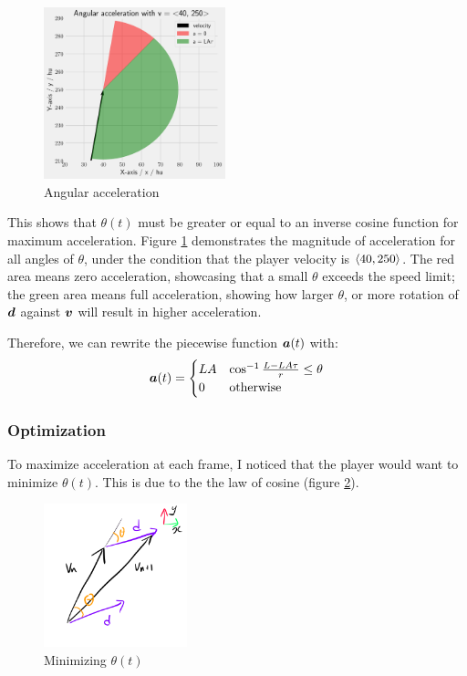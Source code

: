 \begin{figure}
    \includegraphics[width=0.47\textwidth,right]{assets/angular_acceleration_limiting.png}
    \caption{Angular acceleration}
    \label{fig:angular_acceleration_limiting}
\end{figure}
This shows that $\theta(t)$ must be greater or equal to an inverse cosine function for maximum acceleration. Figure \ref{fig:angular_acceleration_limiting} demonstrates the magnitude of acceleration for all angles of $\theta$, under the condition that the player velocity is $\left\langle 40, 250 \right\rangle$. The red area means zero acceleration, showcasing that a small $\theta$ exceeds the speed limit; the green area means full acceleration, showing how larger $\theta$, or more rotation of $\boldsymbol{d}$ against $\boldsymbol{v}$ will result in higher acceleration.

Therefore, we can rewrite the piecewise function $\boldsymbol{a}(t)$ with:
\[
\boldsymbol{a}(t) = \begin{cases}
    LA & \cos^{-1} \frac{L - LA\tau}{r} \le \theta\\
    0 & \text{otherwise}
\end{cases}
\]


\subsubsection{Optimization}
To maximize acceleration at each frame, I noticed that the player would want to minimize $\theta(t)$. This is due to the the law of cosine (figure \ref{fig:min_theta}).

\begin{figure}
    \includegraphics[width=0.37\textwidth,right]{assets/mini_theta.png}
    \caption{Minimizing $\theta(t)$}
    \label{fig:min_theta}
\end{figure}

